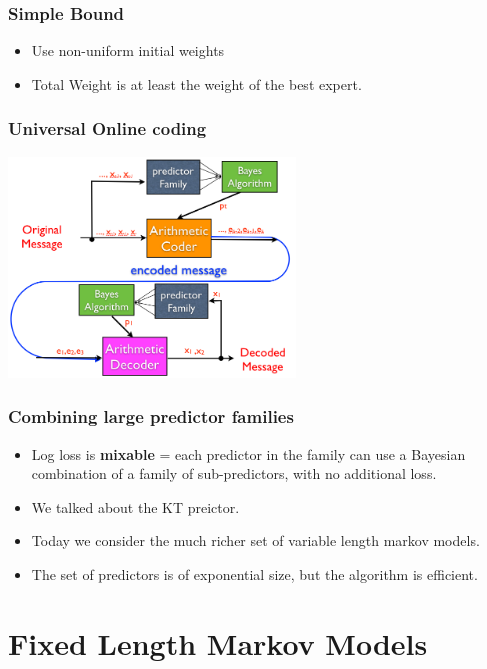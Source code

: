 \documentclass{beamer}
\begin{document}
\begin{frame}
\frametitle{Simple Bound}
\begin{itemize}
\item Use non-uniform initial weights 
\item Total Weight is at least the weight of the best expert.
\end{itemize}
\end{frame}

\begin{frame}
\frametitle{Universal Online coding}
  \includegraphics[width=3in]{figures/ArithmeticCoding_key.png}
\end{frame}

\begin{frame}
\frametitle{Combining large predictor families}
  \begin{itemize}
\item
  Log loss is {\bf mixable} = each predictor in the family can use a
  Bayesian combination of a family of sub-predictors, with no
  additional loss.
\item We talked about the KT preictor.
\item Today we consider the much richer set of variable length
  markov models.
\item The set of predictors is of exponential size, but the
  algorithm is efficient.
\end{itemize}
\end{frame}

\section{Fixed Length Markov Models}
\end{document}
